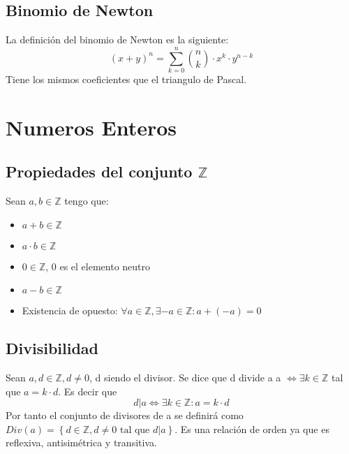 \documentclass{report}
\begin{document}
\section{Binomio de Newton}
La definición del binomio de Newton es la siguiente: \begin{equation}
    (x+y)^n = \sum_{k=0}^n \binom{n}{k} \cdot x^k \cdot y^{n-k}
\end{equation}
Tiene los mismos coeficientes que el triangulo de Pascal.

\chapter{Numeros Enteros}
\section{Propiedades del conjunto $\mathbb{Z}$}
Sean $a, b \in \mathbb{Z}$ tengo que: \begin{itemize}
    \item $a + b \in \mathbb{Z}$
    \item $a \cdot b \in \mathbb{Z}$
    \item $0 \in \mathbb{Z}$, 0 es el elemento neutro
    \item $a - b \in \mathbb{Z}$
    \item Existencia de opuesto: $\forall a \in \mathbb{Z},\exists -a \in \mathbb{Z}: a + (-a) = 0$
\end{itemize}

\section{Divisibilidad}
Sean $a,d \in \mathbb{Z}, d \neq 0$, d siendo el divisor. Se dice que d divide a a $\iff \exists k \in \mathbb{Z}$ tal que $a = k \cdot d$. Es decir que \begin{equation}
    d | a \iff \exists k \in \mathbb{Z}: a = k \cdot d
\end{equation} 
Por tanto el conjunto de divisores de a se definirá como $Div(a) = \left\{d \in \mathbb{Z}, d \neq 0 \text{ tal que } d|a \right\}$. Es una relación de orden ya que es reflexiva, antisimétrica y transitiva.
\end{document}

